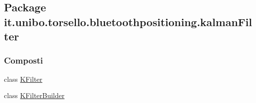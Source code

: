 \hypertarget{namespaceit_1_1unibo_1_1torsello_1_1bluetoothpositioning_1_1kalmanFilter}{}\subsection{Package it.\+unibo.\+torsello.\+bluetoothpositioning.\+kalman\+Filter}
\label{namespaceit_1_1unibo_1_1torsello_1_1bluetoothpositioning_1_1kalmanFilter}
\subsubsection*{Composti}
\begin{DoxyCompactItemize}
\item 
class \hyperlink{classit_1_1unibo_1_1torsello_1_1bluetoothpositioning_1_1kalmanFilter_1_1KFilter}{K\+Filter}
\item 
class \hyperlink{classit_1_1unibo_1_1torsello_1_1bluetoothpositioning_1_1kalmanFilter_1_1KFilterBuilder}{K\+Filter\+Builder}
\end{DoxyCompactItemize}
